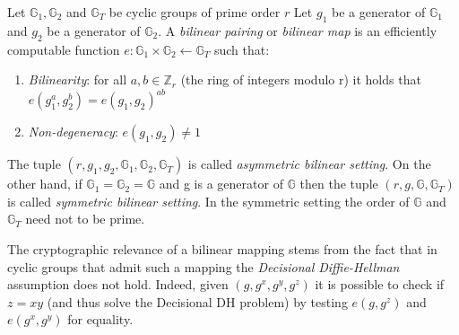 \documentclass[11pt,a4paper]{article}
\begin{document}
Let $\mathbb{G}_1,\mathbb{G}_2$
                    and
                    $\mathbb{G}_T$
                    be cyclic groups of prime order
                    $r$
                    Let
                    $g_1$
                    be a generator of
                    $\mathbb{G}_1$
                    and
$g_2$
                    be a generator of
$\mathbb{G}_2$.
                    A {\em bilinear pairing}
                    or {\em bilinear map}
                    is an efficiently computable function
                    $e : \mathbb{G}_1 \times \mathbb{G}_2 \leftarrow \mathbb{G}_T$
                    such that:

\begin{enumerate}

\item {\em Bilinearity}:
for all $a,b\in\mathbb{Z}_r$
                        (the ring of integers modulo r)
                        it holds that
                        $e(g_1^a,g_2^b) = 
                        e(g_1,g_2)^{ab}$                    
\item {\em Non-degeneracy}:
$e(g_1,g_2)\ne 1$

\end{enumerate}             
               
                    The tuple
                    $(r,g_1,g_2,\mathbb{G}_1,\mathbb{G}_2,\mathbb{G}_T)$
                    is called
                    {\em asymmetric bilinear setting}.
                    On the other hand, if
                    $\mathbb{G}_1=\mathbb{G}_2=\mathbb{G}$
                    and g is a generator of
                    $\mathbb{G}$
                    then the tuple
                    $(r,g,\mathbb{G},\mathbb{G}_T)$ is called
                    {\em symmetric bilinear setting}.
                    In the symmetric setting the order of
                    $\mathbb{G}$
                    and
                    $\mathbb{G}_T$
                    need not to be prime.

                    The cryptographic relevance of a bilinear mapping stems from the fact
                     that in cyclic
                    groups that admit such a mapping the
                    {\em Decisional Diffie-Hellman}
                    assumption does not hold.
                    Indeed, given
                    $(g,g^x,g^y,g^z)$
                    it is possible to check if
                    $z=xy$
                    (and thus solve the Decisional DH problem) by testing
                    $e(g,g^z)$
                    and
                    $e(g^x,g^y)$
                    for equality.
                    
\end{document}
